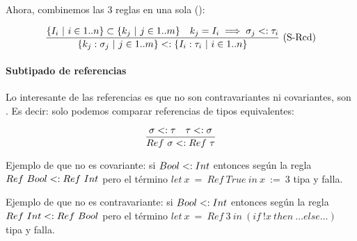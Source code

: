 Ahora, combinemos las 3 reglas en una sola ():

\[\frac{\{I_i \ |\  i \in 1..n\} \subset \{k_j \ |\  j \in 1..m\}\quad k_j = I_i \implies \sigma_j <: \tau_i}{\{k_j : \sigma_j \ |\  j \in 1..m\} <: \{I_i : \tau_i \ |\  i \in 1..n\}}\ \text{(S-Rcd)}\]

\paragraph{Subtipado de referencias}

Lo interesante de las referencias es que no son contravariantes ni covariantes, son . Es decir: solo podemos comparar referencias de tipos equivalentes:

\[\frac{\sigma <: \tau\quad \tau <: \sigma}{Ref\ \sigma <: Ref\ \tau}\]

Ejemplo de que no es covariante: si $Bool <: Int$ entonces según la regla $Ref\ Bool <: Ref\ Int$ pero el término $let\ x\ =\ Ref\ True\ in\ x\ :=\ 3$ tipa y falla.

Ejemplo de que no es contravariante: si $Bool <: Int$ entonces según la regla $Ref\ Int <: Ref\ Bool$ pero el término $let\ x\ =\ Ref\ 3\ in\ (if\ !x\ then\ \dots else \dots)$ tipa y falla.
